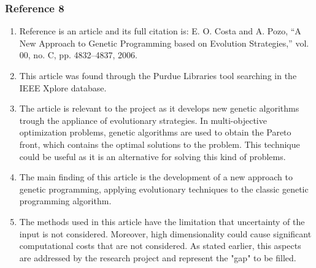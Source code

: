 \documentclass{journal}
\begin{document}
\subsubsection{Reference 8}
\begin{enumerate}
	\item Reference \cite{Costa2006} is an article and its full citation is: E. O. Costa and A. Pozo, “A New Approach to Genetic Programming based on Evolution Strategies,” vol. 00, no. C, pp. 4832–4837, 2006.
	\item This article was found through the Purdue Libraries tool searching in the IEEE Xplore database.
	\item The article is relevant to the project as it develops new genetic algorithms trough the appliance of evolutionary strategies. In multi-objective optimization problems, genetic algorithms are used to obtain the Pareto front, which contains the optimal solutions to the problem. This technique could be useful as it is an alternative for solving this kind of problems.
	\item The main finding of this article is the development of a new approach to genetic programming, applying evolutionary techniques to the classic genetic programming algorithm.
	\item The methods used in this article have the limitation that uncertainty of the input is not considered. Moreover, high dimensionality could cause significant computational costs that are not considered. As stated earlier, this aspects are addressed by the research project and represent the "gap" to be filled.
\end{enumerate}
\end{document}
